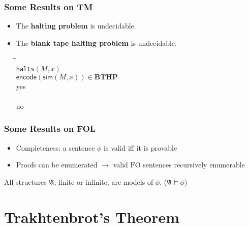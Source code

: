 \documentclass{beamer}
\newcommand{\FO}{\ensuremath{\mathrm{FO}}}
\newcommand{\structa}{\ensuremath{\mathfrak{A}}}
\begin{document}
\begin{frame}
  \frametitle{Some Results on TM}

  \begin{itemize}
    \item The \textbf{halting problem} is undecidable.
    \item The \textbf{blank tape halting problem} is undecidable.
      \begin{center}
        \begin{boxedminipage}{.5\textwidth}
          \begin{tabbing}
            \quad\=\quad\=\quad\=\kill\\
                {\tt halts}$(M,x)$\\
                 $\mathsf{encode}(\mathsf{sim}(M, x)) \in \mathbf{BTHP}$\\
                \>\>yes\\
                \\
                \>\>no\\
          \end{tabbing}
        \end{boxedminipage}
      \end{center}
  \end{itemize}

  
\end{frame}

\begin{frame}
  \frametitle{Some Results on FOL}

  \begin{itemize}
    \item Completeness: a sentence $\phi$ is valid iff it is provable
    \item Proofs can be enumerated $\longrightarrow$ valid $\FO$ sentences
    recursively enumerable
  \end{itemize}

  \begin{definition}[Validity]
    All structures $\structa$, finite or infinite, are models of $\phi$.
    ($\structa \models \phi$)
  \end{definition}
  
\end{frame}

\section{Trakhtenbrot's Theorem}
\end{document}
